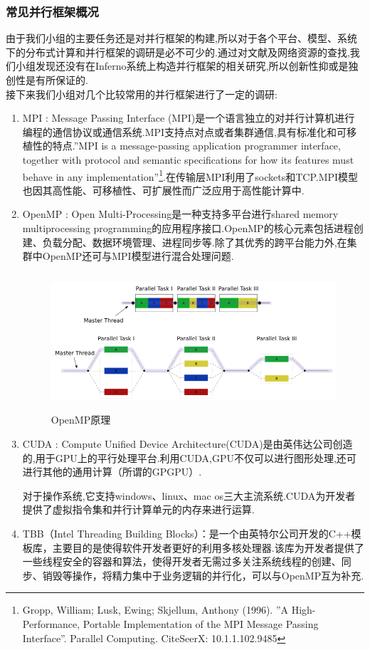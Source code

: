 \documentclass[paper=a4]{ctexart} %
\numberwithin{equation}{section} %
\numberwithin{figure}{section} %
\numberwithin{table}{section} %
\newcommand{\n}{\\\indent}
\begin{document}
\subsubsection{常见并行框架概况}
由于我们小组的主要任务还是对并行框架的构建,所以对于各个平台、模型、系统下的分布式计算和并行框架的调研是必不可少的.通过对文献及网络资源的查找,我们小组发现还没有在Inferno系统上构造并行框架的相关研究,所以创新性抑或是独创性是有所保证的.\n
接下来我们小组对几个比较常用的并行框架进行了一定的调研:
\begin{enumerate}
\item MPI : Message Passing Interface (MPI)是一个语言独立的对并行计算机进行编程的通信协议或通信系统.MPI支持点对点或者集群通信,具有标准化和可移植性的特点.''MPI is a message-passing application programmer interface, together with protocol and semantic specifications for how its features must behave in any implementation''\footnote{Gropp, William; Lusk, Ewing; Skjellum, Anthony (1996). ''A High-Performance, Portable Implementation of the MPI Message Passing Interface''. Parallel Computing. CiteSeerX: 10.1.1.102.9485}.在传输层MPI利用了sockets和TCP.MPI模型也因其高性能、可移植性、可扩展性而广泛应用于高性能计算中.
\item OpenMP : Open Multi-Processing是一种支持多平台进行shared memory multiprocessing programming的应用程序接口.OpenMP的核心元素包括进程创建、负载分配、数据环境管理、进程同步等.除了其优秀的跨平台能力外,在集群中OpenMP还可与MPI模型进行混合处理问题.

\begin{figure}[htbp]
\centering
\includegraphics[width=4.8in,height=2in]{pic/openmp.png}
\caption{OpenMP原理}
\end{figure}

\item CUDA : Compute Unified Device Architecture(CUDA)是由英伟达公司创造的,用于GPU上的平行处理平台.利用CUDA,GPU不仅可以进行图形处理,还可进行其他的通用计算（所谓的GPGPU）.

对于操作系统,它支持windows、linux、mac os三大主流系统.CUDA为开发者提供了虚拟指令集和并行计算单元的内存来进行运算.

\item TBB（Intel Threading Building Blocks）：是一个由英特尔公司开发的C++模板库，主要目的是使得软件开发者更好的利用多核处理器.该库为开发者提供了一些线程安全的容器和算法，使得开发者无需过多关注系统线程的创建、同步、销毁等操作，将精力集中于业务逻辑的并行化，可以与OpenMP互为补充.
\end{enumerate}
\end{document}
